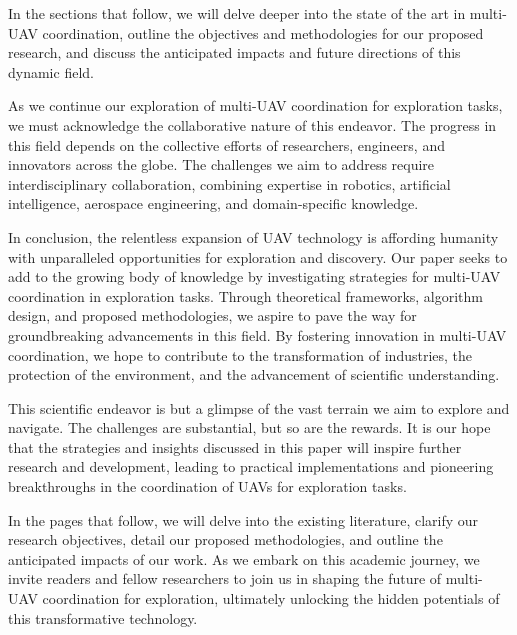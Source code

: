 \documentclass[sigconf]{acmart}
\begin{document}
In the sections that follow, we will delve deeper into the state of the art in multi-UAV coordination, outline the objectives and methodologies for our proposed research, and discuss the anticipated impacts and future directions of this dynamic field.

As we continue our exploration of multi-UAV coordination for exploration tasks, we must acknowledge the collaborative nature of this endeavor. The progress in this field depends on the collective efforts of researchers, engineers, and innovators across the globe. The challenges we aim to address require interdisciplinary collaboration, combining expertise in robotics, artificial intelligence, aerospace engineering, and domain-specific knowledge.

In conclusion, the relentless expansion of UAV technology is affording humanity with unparalleled opportunities for exploration and discovery. Our paper seeks to add to the growing body of knowledge by investigating strategies for multi-UAV coordination in exploration tasks. Through theoretical frameworks, algorithm design, and proposed methodologies, we aspire to pave the way for groundbreaking advancements in this field. By fostering innovation in multi-UAV coordination, we hope to contribute to the transformation of industries, the protection of the environment, and the advancement of scientific understanding.

This scientific endeavor is but a glimpse of the vast terrain we aim to explore and navigate. The challenges are substantial, but so are the rewards. It is our hope that the strategies and insights discussed in this paper will inspire further research and development, leading to practical implementations and pioneering breakthroughs in the coordination of UAVs for exploration tasks.

In the pages that follow, we will delve into the existing literature, clarify our research objectives, detail our proposed methodologies, and outline the anticipated impacts of our work. As we embark on this academic journey, we invite readers and fellow researchers to join us in shaping the future of multi-UAV coordination for exploration, ultimately unlocking the hidden potentials of this transformative technology.


\end{document}
